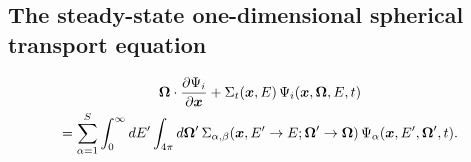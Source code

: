 \documentclass[../main.tex]{subfiles}
\begin{document}
\subsection{The steady-state one-dimensional spherical transport equation}
\begin{multline}
  \boldsymbol{\Omega} \cdot \dfrac{\partial \Psi_i}{\partial \boldsymbol{x}} + \Sigma_t(\boldsymbol{x},E) \, \Psi_i(\boldsymbol{x},\boldsymbol{\Omega},E,t) \\
  = \sum_{\alpha=1}^S\int_{0}^{\infty} dE^{\prime} \int_{4\pi} d \boldsymbol{\Omega}^{\prime} \, \Sigma_{\alpha,\beta}(\boldsymbol{x}, E^{\prime}\rightarrow E; \boldsymbol{\Omega}^{\prime} \rightarrow \boldsymbol{\Omega}) \, \Psi_{\alpha}(\boldsymbol{x},E^{\prime},\boldsymbol{\Omega}^{\prime},t).
\end{multline}
\end{document}
